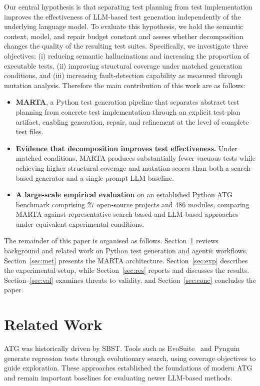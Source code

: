\documentclass{llncs}
\begin{document}
Our central hypothesis is that separating test planning from test implementation improves the effectiveness of LLM-based test generation independently of the underlying language model. To evaluate this hypothesis, we hold the semantic context, model, and repair budget constant and assess whether decomposition changes the quality of the resulting test suites. Specifically, we investigate three objectives: (i) reducing semantic hallucinations and increasing the proportion of executable tests, (ii) improving structural coverage under matched generation conditions, and (iii) increasing fault-detection capability as measured through mutation analysis.
%
Therefore the main contribution of this work are as follows:

\begin{itemize}
\item\textbf{MARTA}, a Python test generation pipeline that separates abstract test planning from concrete test implementation through an explicit test-plan artifact, enabling generation, repair, and refinement at the level of complete test files.

\item \textbf{Evidence that decomposition improves test effectiveness.} Under matched conditions, MARTA produces substantially fewer vacuous tests while achieving higher structural coverage and mutation scores than both a search-based generator and a single-prompt LLM baseline.

\item \textbf{A large-scale empirical evaluation} on an established Python ATG benchmark comprising 27 open-source projects and 486 modules, comparing MARTA against representative search-based and LLM-based approaches under equivalent experimental conditions.
\end{itemize}

The remainder of this paper is organised as follows. Section~\ref{sec:back} reviews background and related work on Python test generation and agentic workflows. Section~\ref{sec:met} presents the MARTA architecture. Section~\ref{sec:exp} describes the experimental setup, while Section~\ref{sec:res} reports and discusses the results. Section~\ref{sec:val} examines threats to validity, and Section~\ref{sec:conc} concludes the paper.

\section{Related Work}
\label{sec:back}
ATG was historically driven by SBST. Tools such as EvoSuite~\cite{fraser2011evosuite} and Pynguin~\cite{lukasczyk2022pynguin} generate regression tests through evolutionary search, using coverage objectives to guide exploration. These approaches established the foundations of modern ATG and remain important baselines for evaluating newer LLM-based methods.
\end{document}
